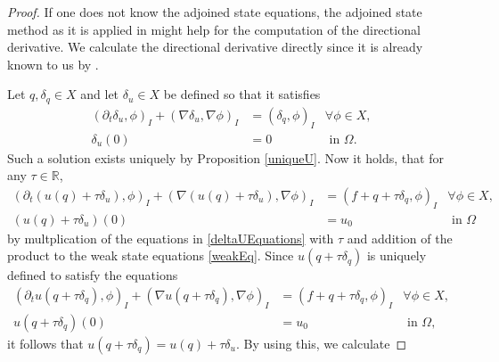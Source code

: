 \begin{proof}
If one does not know the adjoined state equations, the adjoined state method as it is applied in \cite{Plessix2006ARO} might help for the computation of the directional derivative. We calculate the directional derivative directly since it is already known to us by \cite{doi:10.1137/070694016}.

Let $q,\delta_q \in X$ and let $\delta_u\in X$ be defined so that it satisfies
\begin{equation}
\label{deltaUEquations}
\begin{aligned}
	(\partial_t\delta_u,\phi)_I+(\nabla \delta_u,\nabla\phi)_I&=(\delta_q,\phi)_I&\forall\phi\in X,\\
	\delta_u(0)&=0&\text{ in }\Omega.
\end{aligned}
\end{equation}
Such a solution exists uniquely by Proposition \ref{uniqueU}. Now it holds, that for any $\tau\in\mathbb{R}$,
\begin{equation*}
\begin{aligned}
	(\partial_t(u(q)+\tau\delta_u),\phi)_I+(\nabla (u(q)+\tau\delta_u),\nabla\phi)_I&=(f+q+\tau\delta_q,\phi)_I&\forall\phi\in X,\\
	(u(q)+\tau\delta_u)(0)&=u_0&\text{ in }\Omega
\end{aligned}
\end{equation*}
by multplication of the equations in \eqref{deltaUEquations} with $\tau$ and addition of the product to the weak state equations \eqref{weakEq}. Since $u(q+\tau\delta_q)$ is uniquely defined to satisfy the equations
\begin{equation}
\label{partialDerivativeInDeltaUDir}
\begin{aligned}
	(\partial_tu(q+\tau\delta_q),\phi)_I+(\nabla u(q+\tau\delta_q),\nabla\phi)_I&=(f+q+\tau\delta_q,\phi)_I&\forall\phi\in X,\\
	u(q+\tau\delta_q)(0)&=u_0&\text{ in }\Omega,
\end{aligned}
\end{equation}
it follows that $u(q+\tau\delta_q)=u(q)+\tau\delta_u$. By using this, we calculate


\end{proof}
